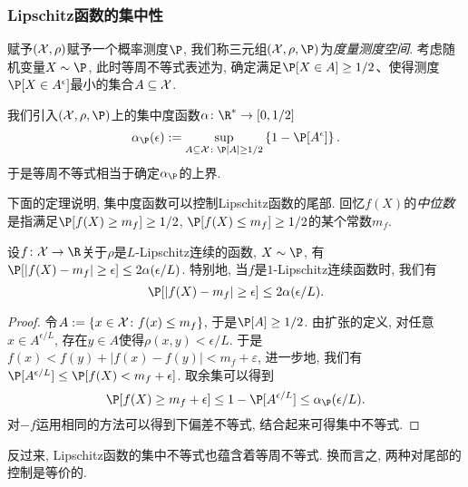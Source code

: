 \subsubsection{Lipschitz函数的集中性}

赋予$(\mathcal{X}, \rho)$赋予一个概率测度$\P$, 我们称三元组$(\cX, \rho, \P)$为\emph{度量测度空间}. 
考虑随机变量$X \sim \P$,  此时等周不等式表述为, 确定满足$\P[X \in A] \geq 1/2$、使得测度$\P[X \in A^{\epsilon}]$最小的集合$A \subseteq \mathcal{X}$.

我们引入$(\cX, \rho, \P)$上的集中度函数$\alpha \colon \R^* \to [0, 1/2]$
\begin{equation*}
	\alpha_{\P}(\epsilon)
	:= \sup_{A \subseteq \cX \colon \P[A] \geq 1/2} \left\{ 1 - \P[A^{\epsilon}] \right\}. 
\end{equation*}
于是等周不等式相当于确定$\alpha_{\P}$的上界. 

下面的定理说明, 集中度函数可以控制Lipschitz函数的尾部. 
回忆$f(X)$的\emph{中位数}是指满足$\P[f(X) \geq m_f] \geq 1/2$, $\P[f(X) \leq m_f] \geq 1/2$的某个常数$m_f$. 

\begin{theorem}[Lévy不等式]
	设$f \colon \cX \to \R$关于$\rho$是$L$-Lipschitz连续的函数, $X \sim \P$, 有$\P[ |f(X) - m_f| \geq \epsilon] \leq 2 \alpha(\epsilon / L)$. 
	特别地, 当$f$是$1$-Lipschitz连续函数时, 我们有
	\begin{equation*}
		\P[ |f(X) - m_f| \geq \epsilon] \leq 2 \alpha(\epsilon / L). 
	\end{equation*}
\end{theorem}
\begin{proof}
	令$A := \{x \in \mathcal{X} \colon f(x) \leq m_f\}$, 于是$\P[A] \geq 1/2$. 
	由扩张的定义, 对任意$x \in A^{\epsilon / L}$, 存在$y \in A$使得$\rho(x,y) < \epsilon / L$. 
	于是$f(x) < f(y) + |f(x) - f(y)| < m_f + \varepsilon$, 进一步地, 我们有$\P[A^{\epsilon / L}] \leq \P[f(X) < m_f + \epsilon]$. 
	取余集可以得到
	\begin{equation*}
		\P[f(X) \geq m_f + \epsilon] 
		\leq 1 - \P[A^{\epsilon / L}] 
		\leq \alpha_{\P}(\epsilon / L). 
	\end{equation*}
	对$-f$运用相同的方法可以得到下偏差不等式, 结合起来可得集中不等式. 
\end{proof}

反过来, Lipschitz函数的集中不等式也蕴含着等周不等式. 
换而言之, 两种对尾部的控制是等价的. 

